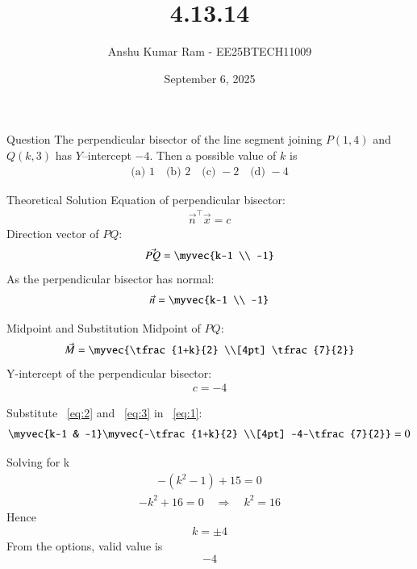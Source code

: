 \documentclass{beamer}
\title{4.13.14}
\date{September 6, 2025}
\author{Anshu Kumar Ram - EE25BTECH11009}
\begin{document}
\frame{\titlepage}

\begin{frame}{Question}
The perpendicular bisector of the line segment joining $P(1,4)$ and $Q(k,3)$ has $Y$--intercept $-4$. Then a possible value of $k$ is
\begin{align}
\text{(a) }1 \quad \text{(b) }2 \quad \text{(c) }-2 \quad \text{(d) }-4
\end{align}
\end{frame}

\begin{frame}{Theoretical Solution}
Equation of perpendicular bisector:
\begin{align}
\vec{n}^{\top}\vec{x} = c \label{eq:1}
\end{align}
Direction vector of $PQ$:
\begin{align}
\vec{PQ} = \myvec{k-1 \\ -1} \label{eq:2}
\end{align}
As the perpendicular bisector has normal:
\begin{align}
\vec{n} = \myvec{k-1 \\ -1}
\end{align}
\end{frame}

\begin{frame}{Midpoint and Substitution}
Midpoint of $PQ$:
\begin{align}
\vec{M} = \myvec{\tfrac{1+k}{2} \\[4pt] \tfrac{7}{2}}
\end{align}
Y-intercept of the perpendicular bisector:
\begin{align}
c = -4 \label{eq:3}
\end{align}

Substitute ~\eqref{eq:2} and ~\eqref{eq:3} in ~\eqref{eq:1}:
\begin{align}
\myvec{k-1 & -1}\myvec{-\tfrac{1+k}{2} \\[4pt] -4-\tfrac{7}{2}}=0
\end{align}
\end{frame}

\begin{frame}{Solving for k}
\begin{align}
-(k^2 - 1) + 15 = 0
\end{align}
\begin{align}
-k^2 + 16 = 0 \quad \Rightarrow \quad k^2 = 16
\end{align}
Hence
\begin{align}
k = \pm 4
\end{align}
From the options, valid value is
\[
\boxed{-4}
\]
\end{frame}
\end{document}
